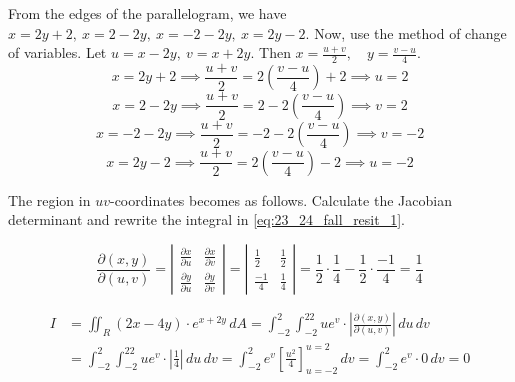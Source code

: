 \documentclass[a4paper, 12pt]{article}
\begin{document}
\begin{enumerate}[leftmargin=*,label=\textbf{\arabic*.}]
From the edges of the parallelogram, we have $\displaystyle x=2y+2,\:x=2-2y,\:x=-2-2y,\:x=2y-2$. Now, use the method of change of variables. Let $\displaystyle u=x-2y,\:v=x+2y$. Then $x=\frac{u+v}2,\quad y=\frac{v-u}{4}$.
\[x=2y+2\implies \frac{u+v}2=2\left(\frac{v-u}4\right)+2\implies u=2\]
\[x=2-2y\implies \frac{u+v}2=2-2\left(\frac{v-u}4\right)\implies v=2\]
\[x=-2-2y\implies \frac{u+v}2=-2-2\left(\frac{v-u}4\right)\implies v=-2\]
\[x=2y-2\implies \frac{u+v}2=2\left(\frac{v-u}4\right)-2\implies u=-2\]

The region in $uv$-coordinates becomes as follows. Calculate the Jacobian determinant and rewrite the integral in \eqref{eq:23_24_fall_resit_1}.

\begin{minipage}[c]{0.25\textwidth}
\centering
{}
\end{minipage}
\hfill
\begin{minipage}[c]{0.65\textwidth}
\[
\frac{\partial(x,y)}{\partial(u,v)}
=
\left|
\begin{array}{cc}
\displaystyle\frac{\partial x}{\partial u}
&
\displaystyle\frac{\partial x}{\partial v}\\[1em]
\displaystyle\frac{\partial y}{\partial u}
&
\displaystyle\frac{\partial y}{\partial v}
\end{array}
\right|
=
\left|
\begin{array}{cc}
\displaystyle\frac12&\displaystyle\frac12\\[1em]
\displaystyle\frac{-1}4&\displaystyle\frac14
\end{array}
\right|
=
\frac12\cdot\frac14
-\frac12\cdot\frac{-1}{4}
=
\frac14
\]
\end{minipage}
\begin{align*}{I}&=\iint_R(2x-4y)\cdot{e}^{x+2y}\,dA=\int_{-2}^2\int_{-2}^22u{e}^{v}\cdot\left|\frac{\partial(x,y)}{\partial(u,v)}\right|\,du\,dv\\[1em]&=\int_{-2}^2\int_{-2}^22u{e}^{v}\cdot\left|\frac14\right|\,du\,dv=\int_{-2}^2{e}^v\left[\frac{u^2}4\right]_{u=-2}^{u=2}\,dv=\int_{-2}^2{e}^v\cdot0\,dv=\boxed0\end{align*}
\end{enumerate}
\end{document}
